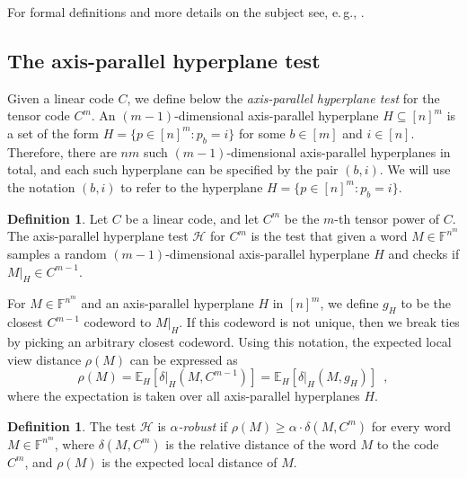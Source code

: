 \documentclass[11pt]{article}
\numberwithin{equation}{section}
\theoremstyle{definition}
\newtheorem{definition}[theorem]{Definition}
\theoremstyle{plain}
\newcommand{\eg}{e.\,g.}
\theoremstyle{plain}
\newcommand{\colored}{}
\newcommand{\reldist}{\colored{\delta}}
\newcommand{\robust}{\colored{\rho}} %
\newcommand{\tester}{\colored{\mathcal H}} %
\newcommand{\plane}{{\colored{H}}} %
\newcommand{\blocklength}{\colored{n}} %
\newcommand{\testerinput}{\colored{M}} %
\newcommand{\closestlocalword}[1]{ \colored{g_{#1}}} %
\newcommand{\Field}{\colored{\mathbb F}}
\begin{document}
For formal definitions and more details on the subject see, \eg, \cite{Goldreich2010}.
%
%
\subsection{The axis-parallel hyperplane test}

Given a linear code $C$, we define below the \emph{axis-parallel hyperplane test} for the tensor code $C^m$.
An $(m-1)$-dimensional axis-parallel hyperplane $\plane \subseteq [\blocklength]^m$ is a set of the form $\plane = \{p \in [\blocklength]^m : p_b = i\}$ for some $b \in [m]$ and $i \in [\blocklength]$. Therefore, there are $\blocklength m$ such $(m-1)$-dimensional axis-parallel hyperplanes in total, and each such hyperplane can be specified by the pair $(b,i)$. We will use the notation $(b,i)$ to refer to the hyperplane $H = \{p \in [\blocklength]^m : p_b = i\}$.


\begin{definition}\label{def:tester}
Let $C$ be a linear code, and let $C^m$ be the
%
$m$-th tensor power of $C$.                                                     %
The axis-parallel hyperplane test $\tester$ for $C^m$ is the test that
given a word $\testerinput \in \Field^{\blocklength^{m}}$
samples a random $(m-1)$-dimensional axis-parallel hyperplane $\plane$
and checks if $\testerinput \vert_{\plane} \in C^{m-1}$.
\end{definition}

For $\testerinput \in \Field^{\blocklength^{m}}$ and an axis-parallel hyperplane $\plane$ in $[\blocklength]^m$, we define $\closestlocalword{\plane}$ to be the closest $C^{m-1}$ codeword to $\testerinput \vert_{\plane}$.
If this codeword is not unique, then we break ties by picking an arbitrary closest codeword.
Using this notation, the expected local view distance $\robust(\testerinput)$ can be expressed as
\begin{equation*}
\robust(\testerinput) = {\mathbb E}_{\plane}[\reldist \vert_{\plane}(\testerinput, C^{m-1})]
 = {\mathbb E}_{\plane}[\reldist \vert_{\plane}(\testerinput, \closestlocalword{\plane})]
%
\enspace,
\end{equation*}
where the expectation is taken over all axis-parallel hyperplanes $\plane$.

\begin{definition}\label{def:robust tester}
The test $\tester$ is \emph{$\alpha$-robust} if $\robust(\testerinput) \geq \alpha \cdot \reldist(\testerinput, C^{m})$ for every word $\testerinput \in \Field^{\blocklength^{m}}$, where $\reldist(\testerinput, C^{m})$ is the relative distance of the word $\testerinput$ to the code $C^{m}$, and $\robust(\testerinput)$ is the expected local distance of $\testerinput$.
\end{definition}
\end{document}
